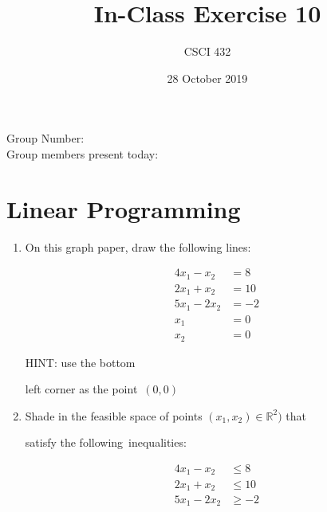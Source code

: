 \documentclass{article}
\title{In-Class Exercise 10}
\author{CSCI 432}
\date{28 October 2019}
\def\R{{\mathbb R}}
\begin{document}
\maketitle



\noindent

Group Number:\\

Group members present today:



\section*{Linear Programming}



\begin{multicols}{2}



\begin{enumerate}

    \item On this graph paper, draw the following lines:

        \begin{align}

            4x_1 - x_2 &= 8\\

            2x_1 + x_2 &= 10\\

            5x_1 -2x_2 &= -2 \\

            x_1 &= 0\\

            x_2 &= 0

        \end{align}

        HINT: use the bottom

        left corner as the point~$(0,0)$

    \item Shade in the feasible space of points $(x_1,x_2)\in \R^2)$ that

        satisfy the following~inequalities:

        \begin{align}

            4x_1 - x_2 &\leq 8\\

            2x_1 + x_2 &\leq 10\\

            5x_1 -2x_2 &\geq -2 \\


\end{align}
\end{enumerate}
\end{multicols}
\end{document}

